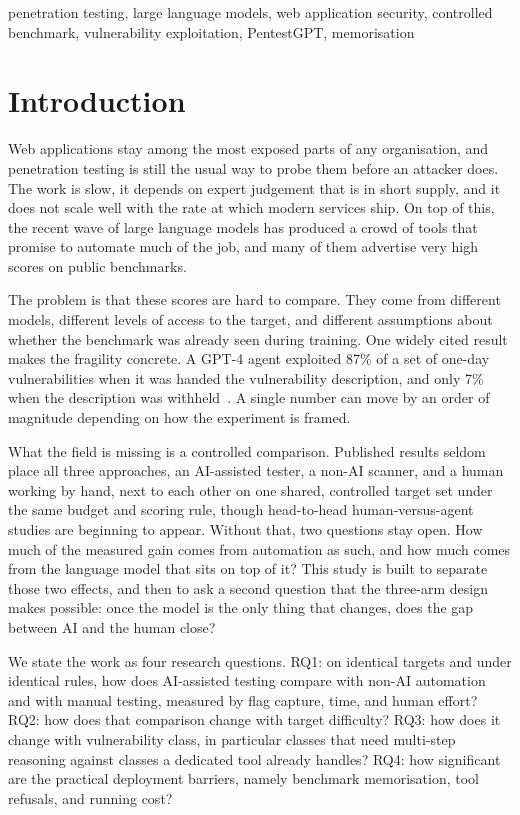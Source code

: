 \documentclass[conference]{IEEEtran}
\begin{document}
\begin{IEEEkeywords}
penetration testing, large language models, web application security, controlled benchmark, vulnerability exploitation, PentestGPT, memorisation
\end{IEEEkeywords}

\section{Introduction}

Web applications stay among the most exposed parts of any organisation, and penetration testing is still the usual way to probe them before an attacker does. The work is slow, it depends on expert judgement that is in short supply, and it does not scale well with the rate at which modern services ship. On top of this, the recent wave of large language models has produced a crowd of tools that promise to automate much of the job, and many of them advertise very high scores on public benchmarks.

The problem is that these scores are hard to compare. They come from different models, different levels of access to the target, and different assumptions about whether the benchmark was already seen during training. One widely cited result makes the fragility concrete. A GPT-4 agent exploited 87\% of a set of one-day vulnerabilities when it was handed the vulnerability description, and only 7\% when the description was withheld~\cite{fang2024}. A single number can move by an order of magnitude depending on how the experiment is framed.

What the field is missing is a controlled comparison. Published results seldom place all three approaches, an AI-assisted tester, a non-AI scanner, and a human working by hand, next to each other on one shared, controlled target set under the same budget and scoring rule, though head-to-head human-versus-agent studies are beginning to appear. Without that, two questions stay open. How much of the measured gain comes from automation as such, and how much comes from the language model that sits on top of it? This study is built to separate those two effects, and then to ask a second question that the three-arm design makes possible: once the model is the only thing that changes, does the gap between AI and the human close?

We state the work as four research questions. RQ1: on identical targets and under identical rules, how does AI-assisted testing compare with non-AI automation and with manual testing, measured by flag capture, time, and human effort? RQ2: how does that comparison change with target difficulty? RQ3: how does it change with vulnerability class, in particular classes that need multi-step reasoning against classes a dedicated tool already handles? RQ4: how significant are the practical deployment barriers, namely benchmark memorisation, tool refusals, and running cost?
\end{document}
